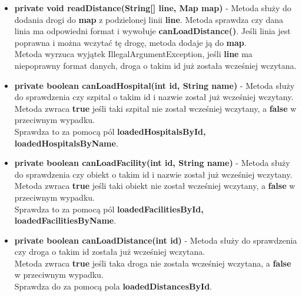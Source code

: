 \documentclass[]{article}
\begin{document}
\begin{itemize}
                        \item \textbf{private void readDistance(String[] line, Map map)} - 
                            Metoda służy do dodania drogi do \textbf{map} z podzielonej linii \textbf{line}.
                            Metoda sprawdza czy dana linia ma odpowiedni format i wywołuje \textbf{canLoadDistance()}.
                            Jeśli linia jest poprawna i można wczytać tę drogę, metoda dodaje ją do \textbf{map}.\\
                            Metoda wyrzuca wyjątek IllegalArgumentException, jeśli 
                                \textbf{line} ma niepoprawny format danych,
                                droga o takim id już została wcześniej wczytana.
                                
                        \item \textbf{private boolean canLoadHospital(int id, String name)} - 
                            Metoda służy do sprawdzenia czy szpital o takim id i nazwie został już wcześniej wczytany.\\
                            Metoda zwraca \textbf{true} jeśli taki szpital nie został wcześniej wczytany,
                            a \textbf{false} w przeciwnym wypadku.\\
                            Sprawdza to za pomocą pól \textbf{loadedHospitalsById, loadedHospitalsByName}.
                            
                        \item \textbf{private boolean canLoadFacility(int id, String name)} - 
                            Metoda służy do sprawdzenia czy obiekt o takim id i nazwie został już wcześniej wczytany.\\
                            Metoda zwraca \textbf{true} jeśli taki obiekt nie został wcześniej wczytany,
                            a \textbf{false} w przeciwnym wypadku.\\
                            Sprawdza to za pomocą pól \textbf{loadedFacilitiesById, loadedFacilitiesByName}.
                            
                        \item \textbf{private boolean canLoadDistance(int id)} - 
                            Metoda służy do sprawdzenia czy droga o takim id została już wcześniej wczytana.\\
                            Metoda zwraca \textbf{true} jeśli taka droga nie została wcześniej wczytana,
                            a \textbf{false} w przeciwnym wypadku.\\
                            Sprawdza do za pomocą pola \textbf{loadedDistancesById}.
                    \end{itemize}
                    
\end{document}
